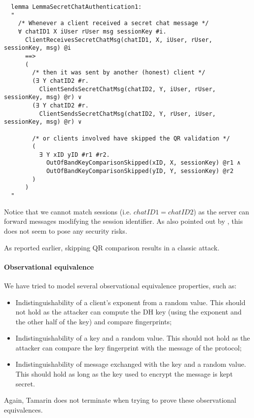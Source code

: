 \begin{lstlisting}
  lemma LemmaSecretChatAuthentication1:
  "
    /* Whenever a client received a secret chat message */
    ∀ chatID1 X iUser rUser msg sessionKey #i.
      ClientReceivesSecretChatMsg(chatID1, X, iUser, rUser, sessionKey, msg) @i
      ==>
      (
        /* then it was sent by another (honest) client */
        (∃ Y chatID2 #r. 
          ClientSendsSecretChatMsg(chatID2, Y, iUser, rUser, sessionKey, msg) @r) ∨
        (∃ Y chatID2 #r. 
          ClientSendsSecretChatMsg(chatID2, Y, rUser, iUser, sessionKey, msg) @r) ∨

        /* or clients involved have skipped the QR validation */
        (
          ∃ Y xID yID #r1 #r2. 
            OutOfBandKeyComparisonSkipped(xID, X, sessionKey) @r1 ∧
            OutOfBandKeyComparisonSkipped(yID, Y, sessionKey) @r2
        )
      )
  "
\end{lstlisting}

Notice that we cannot match sessions (i.e. $chatID1 = chatID2$) as the server can forward messages modifying the session identifier. As also pointed out by \MMNV{} \cite{MTProto2-Proverif}, this does not seem to pose any security risks.

As reported earlier, skipping QR comparison results in a classic \DiHe{} \mitm{} attack.

\paragraph{Observational equivalence} We have tried to model several observational equivalence properties, such as:
\begin{itemize}
  \item Indistinguishability of a client's exponent from a random value. This should not hold as the attacker can compute the DH key (using the exponent and the other half of the key) and compare fingerprints;
  \item Indistinguishability of a \schat{} key and a random value. This should not hold as the attacker can compare the key fingerprint with the  message of the protocol;
  \item Indistinguishability of message exchanged with the \schat{} key and a random value. This should hold as long as the key used to encrypt the message is kept secret.
\end{itemize}

Again, Tamarin does not terminate when trying to prove these observational equivalences.



